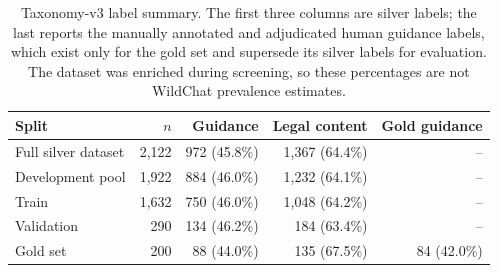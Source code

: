 \begin{table}[t]
\centering
\footnotesize
\setlength{\tabcolsep}{5pt}
\begin{tabular}{lrrrr}
\toprule
Split & $n$ & Guidance & Legal content & Gold guidance \\
\midrule
Full silver dataset & 2,122 & 972 (45.8\%) & 1,367 (64.4\%) & -- \\
Development pool & 1,922 & 884 (46.0\%) & 1,232 (64.1\%) & -- \\
\quad Train & 1,632 & 750 (46.0\%) & 1,048 (64.2\%) & -- \\
\quad Validation & 290 & 134 (46.2\%) & 184 (63.4\%) & -- \\
Gold set & 200 & 88 (44.0\%) & 135 (67.5\%) & 84 (42.0\%) \\
\bottomrule
\end{tabular}
\caption{Taxonomy-v3 label summary. The first three columns are silver labels; the last reports the manually annotated and adjudicated human guidance labels, which exist only for the gold set and supersede its silver labels for evaluation. The dataset was enriched during screening, so these percentages are not WildChat prevalence estimates.}
\label{tab:dataset-summary}
\end{table}

